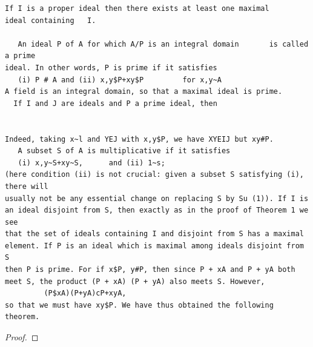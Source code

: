 
\begin{theorem}\label{mcrt-auto-theorem-1-1}\uses{}
\begin{verbatim}
If I is a proper ideal then there exists at least one maximal
ideal containing   I.

   An ideal P of A for which A/P is an integral domain       is called a prime
ideal. In other words, P is prime if it satisfies
   (i) P # A and (ii) x,y$P+xy$P         for x,y~A
A field is an integral domain, so that a maximal ideal is prime.
  If I and J are ideals and P a prime ideal, then


Indeed, taking x~l and YEJ with x,y$P, we have XYEIJ but xy#P.
   A subset S of A is multiplicative if it satisfies
   (i) x,y~S+xy~S,      and (ii) 1~s;
(here condition (ii) is not crucial: given a subset S satisfying (i), there will
usually not be any essential change on replacing S by Su (1)). If I is
an ideal disjoint from S, then exactly as in the proof of Theorem 1 we see
that the set of ideals containing I and disjoint from S has a maximal
element. If P is an ideal which is maximal among ideals disjoint from S
then P is prime. For if x$P, y#P, then since P + xA and P + yA both
meet S, the product (P + xA) (P + yA) also meets S. However,
         (P$xA)(P+yA)cP+xyA,
so that we must have xy$P. We have thus obtained the following theorem.
\end{verbatim}
\end{theorem}
\begin{proof}
\notready
\end{proof}


